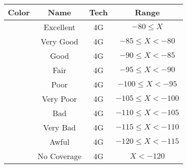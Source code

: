\begin{tabular}{|c|c|c|c|}\hline
\rowcolor{Plum!20}
Color&Name&Tech&Range\\\hline\hline
\cellcolor[HTML]{00703c} &Excellent&4G&$-80\leq X$\\\hline
\cellcolor[HTML]{00a032} &Very Good&4G&$-85\leq X<-80$\\\hline
\cellcolor[HTML]{00d228} &Good&4G&$-90\leq X<-85$\\\hline
\cellcolor[HTML]{ffff00} &Fair&4G&$-95\leq X<-90$\\\hline
\cellcolor[HTML]{ffaa00} &Poor&4G&$-100\leq X<-95$\\\hline
\cellcolor[HTML]{fa6400} &Very Poor&4G&$-105\leq X<-100$\\\hline
\cellcolor[HTML]{ff0000} &Bad&4G&$-110\leq X<-105$\\\hline
\cellcolor[HTML]{dc143c} &Very Bad&4G&$-115\leq X<-110$\\\hline
\cellcolor[HTML]{820000} &Awful&4G&$-120\leq X<-115$\\\hline
\cellcolor[HTML]{aaaaaa} &No Coverage&4G&$X<-120$\\\hline
\end{tabular}
